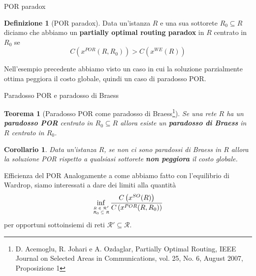 \documentclass{beamer}
\newcounter{counter1}
\theoremstyle{plain}
\newtheorem{myteo}[counter1]{Teorema}
\newtheorem{mycor}[counter1]{Corollario}
\theoremstyle{definition}
\newtheorem{mydef}[counter1]{Definizione}
\theoremstyle{remark}
\newcommand{\pa}[1]{\left(#1\right)}
\begin{document}
\begin{frame}{POR paradox}
  \begin{mydef}[POR paradox]
    Data un'istanza $R$ e una sua sottorete $R_0 \subseteq R$ diciamo
    che abbiamo un \textbf{partially optimal routing paradox} in $R$
    centrato in $R_0$ se 
    \[ C\pa{ x^{POR} (R,R_0)} > C\pa{ x^{WE} (R)} \]
  \end{mydef}
  
  Nell'esempio precedente abbiamo visto un caso in cui la soluzione
  parzialmente ottima peggiora il costo globale, quindi un caso di
  paradosso POR.
\end{frame}


\begin{frame}{Paradosso POR e paradosso di Braess}
  \begin{myteo}[Paradosso POR come paradosso di Braess\footnote{D.
      Acemoglu, R. Johari e A. Ozdaglar, Partially Optimal Routing,
      IEEE Journal on Selected Areas in Communications, vol. 25,
      No. 6, August 2007, Proposizione 1}]
    Se una rete $R$ ha un \textbf{paradosso POR} centrato in
    $R_0\subseteq R$ allora esiste un \textbf{paradosso di Braess} in
    $R$ centrato in $R_0$.
  \end{myteo}
  \begin{mycor}
    Data un'istanza $R$, se non ci sono paradossi di Braess in $R$
    allora la soluzione POR rispetto a qualsiasi sottorete \textbf{non
    peggiora} il costo globale.
  \end{mycor}
\end{frame}

\begin{frame}{Efficienza del POR}
  Analogamente a come abbiamo fatto con l'equilibrio di Wardrop,
  siamo interessati a dare dei limiti alla quantità
  \[ \inf _{\tiny\begin{matrix}R\in \mathcal{R}'\\R_0\subseteq
        R\end{matrix}}
    \frac{C\pa{x^{SO}(R)}}{C\pa{x^{POR}(R,R_0)}} \]
  per opportuni sottoinsiemi di reti $\mathcal{R}' \subseteq
  \mathcal{R}$.
  
\end{frame}
\end{document}
